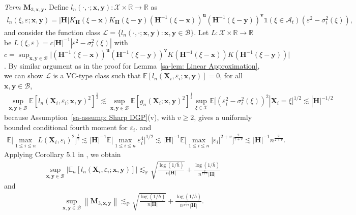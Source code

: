 \documentclass[10pt]{article}
\newcommand{\E}{\mathbb{E}}
\newcommand{\Indicator}{\mathds{1}}
\newcommand{\En}{\mathbb{E}_n}
\newcommand{\reals}{\mathbb{R}}
\newcommand{\norm}[1]{\left\lVert#1\right\rVert}
\newcommand{\lessp}{\lesssim_{\mathbb{P}}}
\newcommand{\bH}{\mathbf{H}}
\newcommand{\bM}{\mathbf{M}}
\newcommand{\bu}{\mathbf{u}}
\newcommand{\bv}{\mathbf{v}}
\newcommand{\bx}{\mathbf{x}}
\newcommand{\bX}{\mathbf{X}}
\newcommand{\by}{\mathbf{y}}
\newcommand{\A}{\mathcal{A}}
\newcommand{\B}{\mathcal{B}}
\newcommand{\X}{\mathcal{X}}
\begin{document}
\medskip\textit{Term $\bM_{3,\bx,\by}$}. Define $l_n(\cdot, \cdot;\bx,\by): \X \times \reals \to \reals$ as
\begin{align*}
    l_n(\xi, \varepsilon;\bx, \by)
    = |\bH|K_{\bH}(\xi - \bx)K_{\bH}(\xi - \by)(\bH^{-1}(\xi - \bx))^{\bu}(\bH^{-1}(\xi - \by))^{\bv} \Indicator(\xi \in \A_t) (\varepsilon^2 - \sigma_t^2(\xi)),
\end{align*}
and consider the function class $\mathcal{L} = \{l_n(\cdot,\cdot;\bx,\by): \bx,\by \in \B\}$. Let $L: \X \times \reals \to \reals$ be $L(\xi, \varepsilon) = c|\bH|^{-1}|\varepsilon^2 - \sigma_t^2(\xi)|$ with $c = \sup_{\bx, \by \in \B} \big|(\bH^{-1}(\xi - \bx))^{\bu}(\bH^{-1}(\xi - \by))^{\bv}K(\bH^{-1}(\xi - \bx)) K(\bH^{-1}(\xi - \by))\big|$. By similar argument as in the proof for Lemma~\ref{sa-lem: Linear Approximation}, we can show $\mathcal{L}$ is a VC-type class such that $\E [l_n(\bX_i,\varepsilon_i; \bx, \by)] = 0$, for all $\bx,\by \in \B$,
\begin{align*}
    \sup_{\bx,\by \in \B}\E[l_n(\bX_i,\varepsilon_i;\bx,\by)^2]^{\frac{1}{2}}
    \lesssim \sup_{\bx, \by \in \B} \E[g_n(\bX_i; \bx, \by)^2]^{\frac{1}{2}}
    \sup_{\xi \in \X}\E[(\varepsilon_i^2-\sigma_t^2(\xi))^2|\bX_i = \xi]^{1/2}
    \lesssim |\bH|^{-1/2}
\end{align*}
because Assumption~\ref{sa-assump: Sharp DGP}(v), with $v\ge2$, gives a uniformly bounded conditional fourth moment for $\varepsilon_i$.
and
\begin{align*}
    \E\big[\max_{1 \leq i \leq n} L(\bX_i,\varepsilon_i)^2\big]^{\frac{1}{2}}
    \lesssim |\bH|^{-1} \E\big[\max_{1 \leq i \leq n}\varepsilon_i^4\big]^{1/2}
    \lesssim |\bH|^{-1} \E\big[\max_{1 \leq i \leq n} |\varepsilon_i|^{2+v}\big]^{\frac{2}{2+v}}
    \lesssim |\bH|^{-1}n^{\frac{2}{2+v}}.
\end{align*}
Applying Corollary 5.1 in \cite{Chernozhukov-Chetverikov-Kato_2014b_AoS}, we obtain
\begin{align*}
    \sup_{\bx, \by \in \B} \big|\En[l_n(\bX_i,\varepsilon_i;\bx,\by)] \big|
    \lessp \sqrt{\frac{\log (1/\bar{h})}{n |\bH|}} + \frac{\log (1/\bar{h})}{n^{\frac{v}{2+v}}|\bH|}
\end{align*}
and
\begin{align*}
    \sup_{\bx, \by \in \B} \norm{\bM_{3,\bx,\by}}
    \lessp \sqrt{\frac{\log (1/\bar{h})}{n |\bH|}} + \frac{\log (1/\bar{h})}{n^{\frac{v}{2+v}}|\bH|}.
\end{align*}
\end{document}
